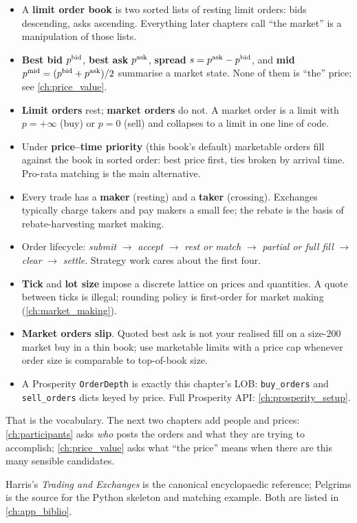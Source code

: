 \begin{itemize}
  \item A \textbf{limit order book} is two sorted lists of resting
  limit orders: bids descending, asks ascending. Everything later
  chapters call ``the market'' is a manipulation of those lists.

  \item \textbf{Best bid} $p^{\mathrm{bid}}$, \textbf{best ask} $p^{\mathrm{ask}}$,
  \textbf{spread} $s = p^{\mathrm{ask}} - p^{\mathrm{bid}}$, and \textbf{mid}
  $p^{\mathrm{mid}} = (p^{\mathrm{bid}} + p^{\mathrm{ask}})/2$ summarise a market state. None of them
  is ``the'' price; see \cref{ch:price_value}.

  \item \textbf{Limit orders} rest; \textbf{market orders} do not. A
  market order is a limit with $p = +\infty$ (buy) or $p = 0$ (sell)
  and collapses to a limit in one line of code.

  \item Under \textbf{price--time priority} (this book's default)
  marketable orders fill against the book in sorted order: best
  price first, ties broken by arrival time. Pro-rata matching is the
  main alternative.

  \item Every trade has a \textbf{maker} (resting) and a
  \textbf{taker} (crossing). Exchanges typically charge takers and
  pay makers a small fee; the rebate is the basis of rebate-harvesting
  market making.

  \item Order lifecycle: \emph{submit} $\to$ \emph{accept} $\to$
  \emph{rest or match} $\to$ \emph{partial or full fill} $\to$
  \emph{clear} $\to$ \emph{settle}. Strategy work cares about the
  first four.

  \item \textbf{Tick} and \textbf{lot size} impose a discrete lattice
  on prices and quantities. A quote between ticks is illegal;
  rounding policy is first-order for market making
  (\cref{ch:market_making}).

  \item \textbf{Market orders slip}. Quoted best ask is not your
  realised fill on a size-$200$ market buy in a thin book; use
  marketable limits with a price cap whenever order size is
  comparable to top-of-book size.

  \item A Prosperity \texttt{OrderDepth} is exactly this chapter's
  LOB: \texttt{buy\_orders} and \texttt{sell\_orders} dicts keyed by
  price. Full Prosperity API: \cref{ch:prosperity_setup}.
\end{itemize}

That is the vocabulary. The next two chapters add people and prices:
\cref{ch:participants} asks \emph{who} posts the orders and what they
are trying to accomplish; \cref{ch:price_value} asks what ``the
price'' means when there are this many sensible candidates.

Harris's \emph{Trading and Exchanges} \citeHarris{} is the canonical
encyclopaedic reference; Pelgrims \citep{pelgrims2020matching} is the
source for the Python skeleton and matching example.
Both are listed in \cref{ch:app_biblio}.
